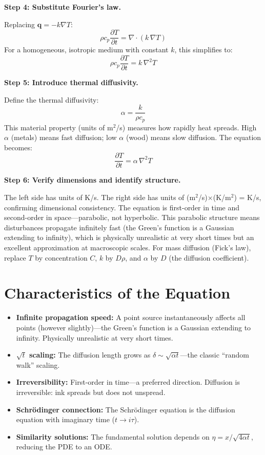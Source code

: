 \documentclass[11pt,openright]{book}
\begin{document}
\textbf{Step 4: Substitute Fourier's law.}

Replacing $\mathbf{q} = -k\nabla T$:
\begin{equation}
\rho c_p \frac{\partial T}{\partial t} = \nabla \cdot (k\,\nabla T)
\end{equation}
For a homogeneous, isotropic medium with constant $k$, this simplifies to:
\begin{equation}
\rho c_p \frac{\partial T}{\partial t} = k\,\nabla^2 T
\end{equation}

\textbf{Step 5: Introduce thermal diffusivity.}

Define the thermal diffusivity:
\begin{equation}
\alpha = \frac{k}{\rho c_p}
\end{equation}
This material property (units of m$^2$/s) measures how rapidly heat spreads. High $\alpha$ (metals) means fast diffusion; low $\alpha$ (wood) means slow diffusion. The equation becomes:
\begin{equation}
\frac{\partial T}{\partial t} = \alpha\,\nabla^2 T
\end{equation}

\textbf{Step 6: Verify dimensions and identify structure.}

The left side has units of K/s. The right side has units of (m$^2$/s)$\times$(K/m$^2$) = K/s, confirming dimensional consistency. The equation is first-order in time and second-order in space---parabolic, not hyperbolic. This parabolic structure means disturbances propagate infinitely fast (the Green's function is a Gaussian extending to infinity), which is physically unrealistic at very short times but an excellent approximation at macroscopic scales. For mass diffusion (Fick's law), replace $T$ by concentration $C$, $k$ by $D\rho$, and $\alpha$ by $D$ (the diffusion coefficient).

\section*{Characteristics of the Equation}

\begin{itemize}
\item \textbf{Infinite propagation speed:} A point source instantaneously affects all points (however slightly)---the Green's function is a Gaussian extending to infinity. Physically unrealistic at very short times.
\item \textbf{$\sqrt{t}$ scaling:} The diffusion length grows as $\delta \sim \sqrt{\alpha t}$---the classic ``random walk'' scaling.
\item \textbf{Irreversibility:} First-order in time---a preferred direction. Diffusion is irreversible: ink spreads but does not unspread.
\item \textbf{Schr\"odinger connection:} The Schr\"odinger equation is the diffusion equation with imaginary time ($t \to i\tau$).
\item \textbf{Similarity solutions:} The fundamental solution depends on $\eta = x/\sqrt{4\alpha t}$, reducing the PDE to an ODE.
\end{itemize}
\end{document}
